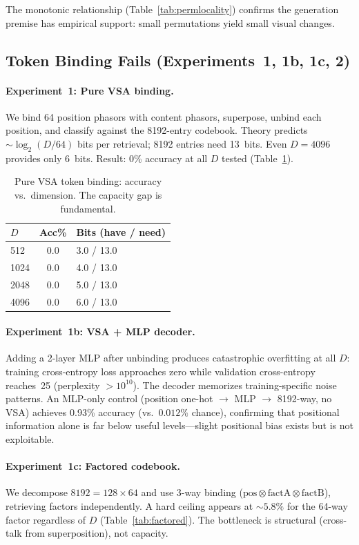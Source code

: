 \documentclass{article}
\begin{document}
The monotonic relationship (Table~\ref{tab:permlocality}) confirms the generation premise has empirical support: small permutations yield small visual changes.

\subsection{Token Binding Fails (Experiments~1, 1b, 1c, 2)}

\paragraph{Experiment~1: Pure VSA binding.}
We bind 64 position phasors with content phasors, superpose, unbind each position, and classify against the 8192-entry codebook.
Theory predicts ${\sim}\log_2(D/64)$ bits per retrieval; 8192 entries need 13~bits.
Even $D{=}4096$ provides only 6~bits.
Result: 0\% accuracy at all $D$ tested (Table~\ref{tab:tokenbinding}).

\begin{table}[h]
\centering
\caption{Pure VSA token binding: accuracy vs.\ dimension. The capacity gap is fundamental.}
\label{tab:tokenbinding}
\begin{tabular}{lcl}
\toprule
$D$ & Acc\% & Bits (have / need) \\
\midrule
512 & 0.0 & 3.0 / 13.0 \\
1024 & 0.0 & 4.0 / 13.0 \\
2048 & 0.0 & 5.0 / 13.0 \\
4096 & 0.0 & 6.0 / 13.0 \\
\bottomrule
\end{tabular}
\end{table}

\paragraph{Experiment~1b: VSA + MLP decoder.}
Adding a 2-layer MLP after unbinding produces catastrophic overfitting at all $D$: training cross-entropy loss approaches zero while validation cross-entropy reaches~25 (perplexity $>10^{10}$).
The decoder memorizes training-specific noise patterns.
An MLP-only control (position one-hot $\to$ MLP $\to$ 8192-way, no VSA) achieves 0.93\% accuracy (vs.\ $0.012\%$ chance), confirming that positional information alone is far below useful levels---slight positional bias exists but is not exploitable.

\paragraph{Experiment~1c: Factored codebook.}
We decompose $8192 = 128 \times 64$ and use 3-way binding ($\text{pos} \otimes \text{factA} \otimes \text{factB}$), retrieving factors independently.
A hard ceiling appears at ${\sim}5.8\%$ for the 64-way factor regardless of $D$ (Table~\ref{tab:factored}).
The bottleneck is structural (cross-talk from superposition), not capacity.
\end{document}
